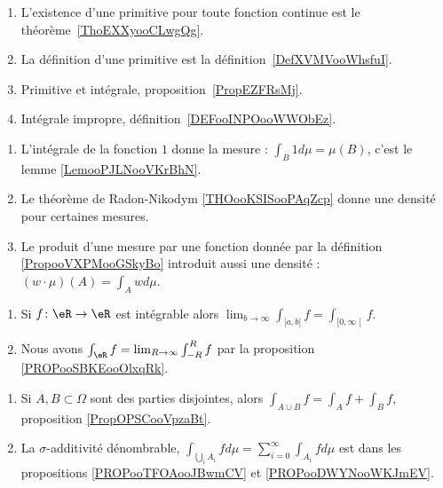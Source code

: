 \begin{description}
\begin{enumerate}
			\item
			      L'existence d'une primitive pour toute fonction continue est le théorème~\ref{ThoEXXyooCLwgQg}.
			\item
			      La définition d'une primitive est la définition~\ref{DefXVMVooWhsfuI}.
			\item
			      Primitive et intégrale, proposition~\ref{PropEZFRsMj}.
			\item
			      Intégrale impropre, définition~\ref{DEFooINPOooWWObEz}.
		\end{enumerate}
	\item[Intégrale et mesure]
		\begin{enumerate}
			\item
			      L'intégrale de la fonction \( 1\) donne la mesure : \( \int_B1d\mu=\mu(B)\), c'est le lemme \ref{LemooPJLNooVKrBhN}.
			\item
			      Le théorème de Radon-Nikodym \ref{THOooKSISooPAqZcp} donne une densité pour certaines mesures.
			\item
			      Le produit d'une mesure par une fonction donnée par la définition \ref{PropooVXPMooGSkyBo} introduit aussi une densité : \( (w\cdot \mu)(A)=\int_Awd\mu\).
		\end{enumerate}

	\item[Limite dans les bornes]
		\begin{enumerate}
			\item
			      Si \(f \colon \eR\to \eR  \) est intégrable alors \(  \lim_{b \to\infty}\int_{\mathopen[ a,b\mathclose]}f=\int_{\mathopen[ 0,\infty\mathclose[}f\).
			\item
			      Nous avons \( \int_{\eR}f=\lim_{R\to \infty}\int_{-R}^Rf\) par la proposition \ref{PROPooSBKEooOlxqRk}.
		\end{enumerate}

	\item[Autre résultats]
		\begin{enumerate}
			\item
			      Si \( A,B\subset \Omega\) sont des parties disjointes, alors \( \int_{A\cup B}f=\int_Af+\int_Bf\), proposition \ref{PropOPSCooVpzaBt}.
			\item
			      La \( \sigma\)-additivité dénombrable, \( \int_{\bigcup_iA_i}fd\mu=\sum_{i=0}^{\infty}\int_{A_i}fd\mu\) est dans les propositions \ref{PROPooTFOAooJBwmCV} et \ref{PROPooDWYNooWKJmEV}.
		\end{enumerate}
\end{description}
